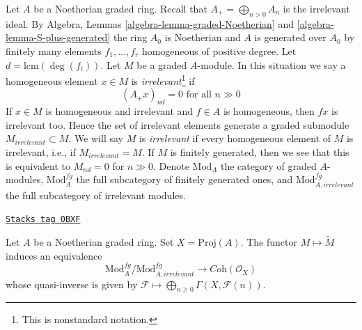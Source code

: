 Let $A$ be a Noetherian graded ring. Recall that
$A_+ = \bigoplus_{n > 0} A_n$ is the irrelevant ideal.
By Algebra, Lemmas \ref{algebra-lemma-graded-Noetherian} and
\ref{algebra-lemma-S-plus-generated} the ring $A_0$ is Noetherian
and $A$ is generated over $A_0$ by finitely many elements
$f_1, \ldots, f_r$ homogeneous of positive degree.
Let $d = \text{lcm}(\deg(f_i))$. Let $M$ be a graded $A$-module.
In this situation we say a homogeneous element $x \in M$
is {\it irrelevant}\footnote{This is nonstandard notation.} if
$$
(A_+ x)_{nd} = 0\text{ for all }n \gg 0
$$
If $x \in M$ is homogeneous and irrelevant and $f \in A$
is homogeneous, then $fx$ is irrelevant too. Hence
the set of irrelevant elements generate a graded submodule
$M_{irrelevant} \subset M$. We will say $M$ is {\it irrelevant}
if every homogeneous element of $M$ is irrelevant, i.e.,
if $M_{irrelevant} = M$.
If $M$ is finitely generated, then we see that
this is equivalent to $M_{nd} = 0$ for $n \gg 0$.
Denote $\text{Mod}_A$ the category of graded $A$-modules,
$\text{Mod}^{fg}_A$ the full subcategory of finitely generated ones,
and $\text{Mod}^{fg}_{A, irrelevant}$ the full subcategory of
irrelevant modules.

\begin{proposition}
\label{coherent-proposition-coherent-modules-on-proj-general}
\href{https://stacks.math.columbia.edu/tag/0BXF}{\texttt{Stacks tag 0BXF}}

Let $A$ be a Noetherian graded ring. Set $X = \text{Proj}(A)$. The functor
$M \mapsto \widetilde M$ induces an equivalence
$$
\text{Mod}^{fg}_A/\text{Mod}^{fg}_{A, irrelevant}
\longrightarrow
\textit{Coh}(\mathcal{O}_X)
$$
whose quasi-inverse is given by
$\mathcal{F} \longmapsto \bigoplus_{n \geq 0} \Gamma(X, \mathcal{F}(n))$.
\end{proposition}


